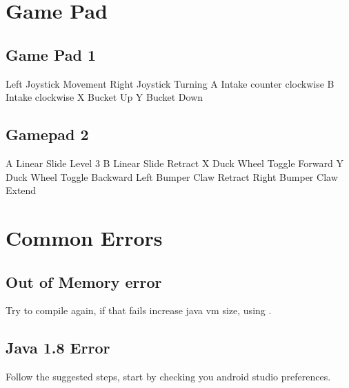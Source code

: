 \documentclass[letterpaper,10pt,english]{sphinxmanual}
\begin{document}
\section{Game Pad}
\label{\detokenize{game_pad:game-pad}}\label{\detokenize{game_pad::doc}}

\subsection{Game Pad 1}
\label{\detokenize{game_pad:game-pad-1}}

\sphinxAtStartPar
Left Joystick \sphinxhyphen{} Movement
Right Joystick \sphinxhyphen{} Turning
A \sphinxhyphen{} Intake counter clockwise
B \sphinxhyphen{} Intake clockwise
X \sphinxhyphen{}  Bucket Up
Y \sphinxhyphen{} Bucket Down


\subsection{Gamepad 2}
\label{\detokenize{game_pad:gamepad-2}}
\sphinxAtStartPar
A \sphinxhyphen{} Linear Slide Level 3
B \sphinxhyphen{} Linear Slide Retract
X \sphinxhyphen{} Duck Wheel Toggle Forward
Y \sphinxhyphen{} Duck Wheel Toggle Backward
Left Bumper \sphinxhyphen{} Claw Retract
Right Bumper \sphinxhyphen{} Claw Extend


\section{Common Errors}
\label{\detokenize{common_errors:common-errors}}\label{\detokenize{common_errors::doc}}

\subsection{Out of Memory error}
\label{\detokenize{common_errors:out-of-memory-error}}
\sphinxAtStartPar
Try to compile again, if that fails increase java vm size, using .


\subsection{Java 1.8 Error}
\label{\detokenize{common_errors:java-1-8-error}}
\sphinxAtStartPar
Follow the suggested steps, start by checking you android studio preferences.
\end{document}
